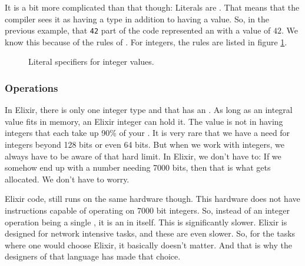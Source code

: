 It is a bit more complicated than that though: Literals are . That means that the compiler sees it as having a type in addition to having a value. So, in the previous example, that \texttt{42} part of the code represented an  with a value of $42$. We know this because of the  rules of \csharp. For integers, the rules are listed in figure \ref{fig:primitives:int:literals}.

\begin{figure}[tbp]
  
  \caption{Literal specifiers for integer values.}
  \label{fig:primitives:int:literals}
\end{figure}


\subsubsection{Operations}


\begin{syntaxfloat}
  
  \caption{Expressions of arithmetic operators}
  \label{syntax:prim:arithmetic:ops}
\end{syntaxfloat}



In Elixir, there is only one integer type and that has an . As long as an integral value fits in memory, an Elixir integer can hold it. The value is not in having integers that each take up 90\% of your . It is very rare that we have a need for integers beyond 128 bits or even 64 bits. But when we work with  integers, we always have to be aware of that hard limit. In Elixir, we don't have to: If we somehow end up with a number needing 7000 bits, then that is what gets allocated. We don't have to worry.

Elixir code, still runs on the same hardware though. This hardware does not have instructions capable of operating on 7000 bit integers. So, instead of an integer operation being a single , it is an  in itself. This is significantly slower. Elixir is designed for network intensive tasks, and these are even slower. So, for the tasks where one would choose Elixir, it basically doesn't matter. And that is why the designers of that language has made that choice.

